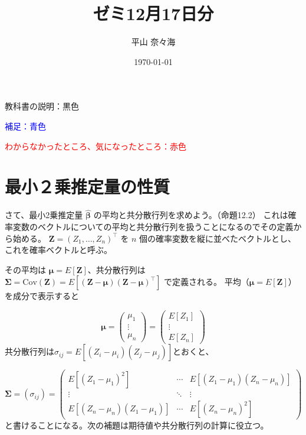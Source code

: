 \documentclass{article}
\title{ゼミ12月17日分}
\author{平山 奈々海}
\date{\today}
\begin{document}
\maketitle


教科書の説明：黒色

\textcolor{blue}{補足：青色}

\textcolor{red}{わからなかったところ、気になったところ：赤色}

\section{最小２乗推定量の性質}

さて、最小2乗推定量 $\bm{\hat{\beta}}$ の平均と共分散行列を求めよう。（命題12.2）
これは確率変数のベクトルについての平均と共分散行列を扱うことになるのでその定義から始める。
$\bm{Z} = (Z_1, \ldots, Z_n)^\top$ を $n$ 個の確率変数を縦に並べたベクトルとし、これを確率ベクトルと呼ぶ。

その平均は $\bm{\mu} = E[\bm{Z}]$、共分散行列は$\bm{\Sigma} = \mathrm{Cov}(\bm{Z}) = E[(\bm{Z} - \bm{\mu})(\bm{Z} - \bm{\mu})^\top]$
で定義される。
平均（$\bm{\mu} = E[\bm{Z}]$）を成分で表示すると

\begin{equation*}
  \bm{\mu} =
  \begin{pmatrix}
  \mu_1 \\
  \vdots \\
  \mu_n
  \end{pmatrix}
  =
  \begin{pmatrix}
  E[Z_1] \\
  \vdots \\
  E[Z_n]
  \end{pmatrix}
\end{equation*}
共分散行列は$\sigma_{ij} = E[(Z_i - \mu_i)(Z_j - \mu_j)]$とおくと、


\begin{equation*}
  \bm{\Sigma} = (\sigma_{ij}) =
  \begin{pmatrix}
  E[(Z_1 - \mu_1)^2] & \cdots & E[(Z_1 - \mu_1)(Z_n - \mu_n)] \\
  \vdots & \ddots & \vdots \\
  E[(Z_n - \mu_n)(Z_1 - \mu_1)] & \cdots & E[(Z_n - \mu_n)^2]
  \end{pmatrix}
\end{equation*}
と書けることになる。次の補題は期待値や共分散行列の計算に役立つ。

\bigskip

\newpage
\end{document}
